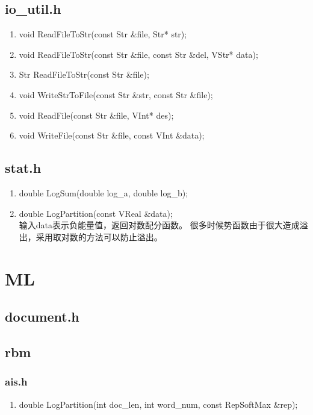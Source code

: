 \section{io\_util.h}
\begin{enumerate}
\item void ReadFileToStr(const Str \&file, Str* str);
\item void ReadFileToStr(const Str \&file, const Str \&del, VStr* data);
\item Str ReadFileToStr(const Str \&file);
\item void WriteStrToFile(const Str \&str, const Str \&file);
\item void ReadFile(const Str \&file, VInt* des);
\item void WriteFile(const Str \&file, const VInt \&data);
\end{enumerate}

\section{stat.h}
\begin{enumerate}
\item double LogSum(double log\_a, double log\_b);
\item double LogPartition(const VReal \&data);
\\输入data表示负能量值，返回对数配分函数。
很多时候势函数由于很大造成溢出，采用取对数的方法可以防止溢出。
\end{enumerate}

\chapter{ML}
\section{document.h}

\section{rbm}
\subsection{ais.h}
\begin{enumerate}
\item double LogPartition(int doc\_len, int word\_num, const RepSoftMax \&rep);
\end{enumerate}

